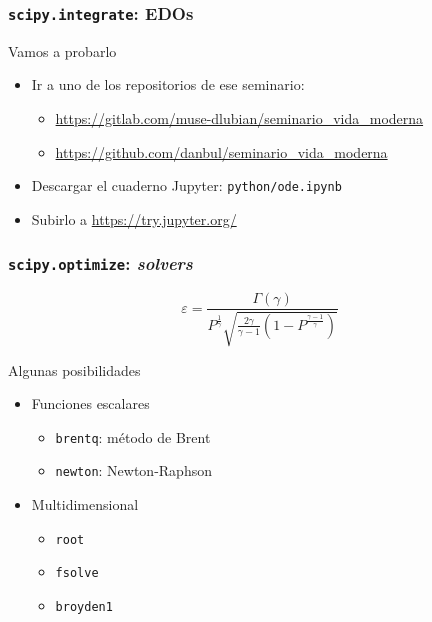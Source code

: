 \documentclass{beamer}
\begin{document}
\begin{frame}\frametitle{\texttt{scipy.integrate}: EDOs}
	\begin{block}{Vamos a probarlo}
		\begin{itemize}
			\item Ir a uno de los repositorios de ese seminario:
			\begin{itemize}
				\item \url{https://gitlab.com/muse-dlubian/seminario_vida_moderna}
				\item \url{https://github.com/danbul/seminario_vida_moderna}
			\end{itemize}
			\item Descargar el cuaderno Jupyter: \texttt{python/ode.ipynb}
			\item Subirlo a \url{https://try.jupyter.org/}
		\end{itemize}
	\end{block}
\end{frame}

\begin{frame}\frametitle{\texttt{scipy.optimize}: \textsl{solvers}}
	$$
		\varepsilon = \frac{\Gamma(\gamma)}{ P^{\frac{1}{\gamma}} \sqrt{\frac{2\gamma}{\gamma -1}\left( 1 - P^{\frac{\gamma - 1}{\gamma}} \right)} }
	$$
	
	\begin{block}{Algunas posibilidades}
		\begin{itemize}
			\item Funciones escalares
			\begin{itemize}
				\item \texttt{brentq}: método de Brent
				\item \texttt{newton}: Newton-Raphson
			\end{itemize}
			\item Multidimensional
			\begin{itemize}
				\item \texttt{root}
				\item \texttt{fsolve}
				\item \texttt{broyden1}
			\end{itemize}
		\end{itemize}
	\end{block}

\end{frame}


\end{document}
